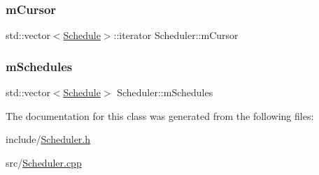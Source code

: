 \subsubsection{\texorpdfstring{m\+Cursor}{mCursor}}
{\footnotesize\ttfamily std\+::vector$<$\mbox{\hyperlink{struct_schedule}{Schedule}}$>$\+::iterator Scheduler\+::m\+Cursor\hspace{0.3cm}{\ttfamily [private]}}

\mbox{\label{class_scheduler_a785bcdb6ecc1f238540e554e45aace7c}} 
\subsubsection{\texorpdfstring{m\+Schedules}{mSchedules}}
{\footnotesize\ttfamily std\+::vector$<$\mbox{\hyperlink{struct_schedule}{Schedule}}$>$ Scheduler\+::m\+Schedules\hspace{0.3cm}{\ttfamily [private]}}



The documentation for this class was generated from the following files\+:\begin{DoxyCompactItemize}
\item 
include/\mbox{\hyperlink{_scheduler_8h}{Scheduler.\+h}}\item 
src/\mbox{\hyperlink{_scheduler_8cpp}{Scheduler.\+cpp}}\end{DoxyCompactItemize}
